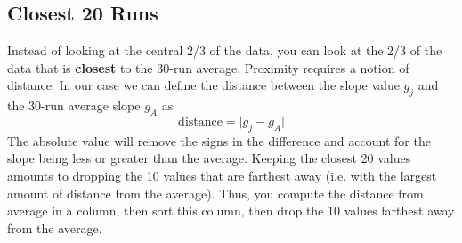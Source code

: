 \subsection{Closest 20 Runs} \label{sec:01.closest.20}
%
Instead of looking at the central 2/3 of the data, you can look at the 2/3 of the data that is \textbf{closest} to the 30-run average. Proximity requires a notion of distance. In our case we can define the distance between the slope value $g_{j}$ and the 30-run average slope $g_{A}$ as
\begin{equation}
    \text{distance} = \vert g_{j} - g_{A} \vert
\end{equation}
The absolute value will remove the signs in the difference and account for the slope being less or greater than the average. Keeping the closest 20 values amounts to dropping the 10 values that are farthest away (i.e. with the largest amount of distance from the average). Thus, you compute the distance from average in a column, then sort this column, then drop the 10 values farthest away from the average.


